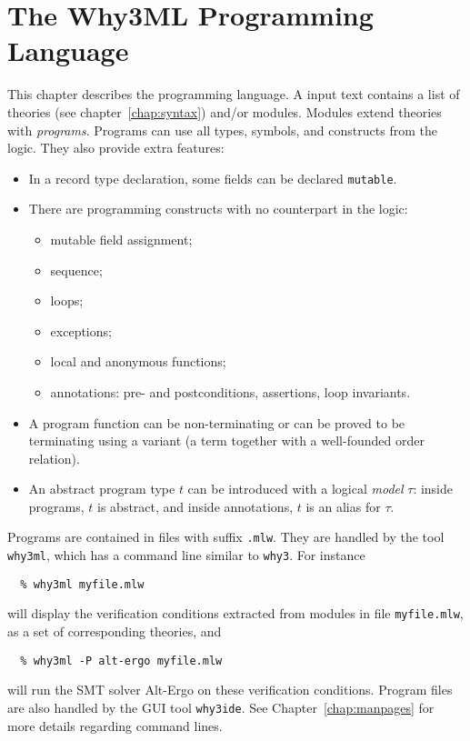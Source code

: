 \chapter{The Why3ML Programming Language}
\label{chap:whyml}

This chapter describes the \whyml programming language.
A \whyml input text contains a list of theories (see
chapter~\ref{chap:syntax}) and/or modules.
Modules extend theories with \emph{programs}.
Programs can use all types, symbols, and constructs from the logic.
They also provide extra features:
\begin{itemize}
\item
  In a record type declaration, some fields can be declared
  \texttt{mutable}.
\item
  There are programming constructs with no counterpart in the logic:
  \begin{itemize}
  \item mutable field assignment;
  \item sequence;
  \item loops;
  \item exceptions;
  \item local and anonymous functions;
  \item annotations: pre- and postconditions, assertions, loop invariants.
  \end{itemize}
\item
  A program function can be non-terminating or can be proved
  to be terminating using a variant (a term together with a well-founded
  order relation).
\item
  An abstract program type $t$ can be introduced with a logical
  \emph{model} $\tau$: inside programs, $t$ is abstract, and inside
  annotations, $t$ is an alias for $\tau$.
\end{itemize}
%
Programs are contained in files with suffix \verb|.mlw|.
They are handled by the tool \texttt{why3ml}, which has a command line
similar to \texttt{why3}. For instance
\begin{verbatim}
  % why3ml myfile.mlw
\end{verbatim}
will display the verification conditions extracted from modules in
file \texttt{myfile.mlw}, as a set of corresponding theories, and
\begin{verbatim}
  % why3ml -P alt-ergo myfile.mlw
\end{verbatim}
will run the SMT solver Alt-Ergo on these verification conditions.
Program files are also handled by the GUI tool \texttt{why3ide}.
See Chapter~\ref{chap:manpages} for more details regarding command lines.

